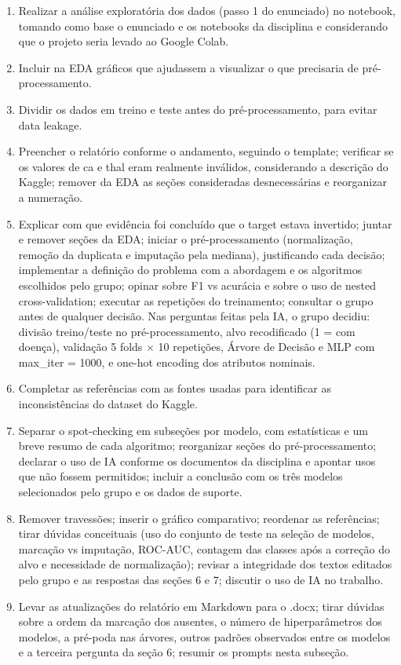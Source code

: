 \documentclass[11pt,letterpaper]{article}
\begin{document}
\begin{enumerate}
\item Realizar a análise exploratória dos dados (passo 1 do enunciado) no notebook, tomando como base o enunciado e os notebooks da disciplina e considerando que o projeto seria levado ao Google Colab.
\item Incluir na EDA gráficos que ajudassem a visualizar o que precisaria de pré-processamento.
\item Dividir os dados em treino e teste antes do pré-processamento, para evitar data leakage.
\item Preencher o relatório conforme o andamento, seguindo o template; verificar se os valores de ca e thal eram realmente inválidos, considerando a descrição do Kaggle; remover da EDA as seções consideradas desnecessárias e reorganizar a numeração.
\item Explicar com que evidência foi concluído que o target estava invertido; juntar e remover seções da EDA; iniciar o pré-processamento (normalização, remoção da duplicata e imputação pela mediana), justificando cada decisão; implementar a definição do problema com a abordagem e os algoritmos escolhidos pelo grupo; opinar sobre F1 vs acurácia e sobre o uso de nested cross-validation; executar as repetições do treinamento; consultar o grupo antes de qualquer decisão. Nas perguntas feitas pela IA, o grupo decidiu: divisão treino/teste no pré-processamento, alvo recodificado (1 = com doença), validação 5 folds \(\times\) 10 repetições, Árvore de Decisão e MLP com max\_iter = 1000, e one-hot encoding dos atributos nominais.
\item Completar as referências com as fontes usadas para identificar as inconsistências do dataset do Kaggle.
\item Separar o spot-checking em subseções por modelo, com estatísticas e um breve resumo de cada algoritmo; reorganizar seções do pré-processamento; declarar o uso de IA conforme os documentos da disciplina e apontar usos que não fossem permitidos; incluir a conclusão com os três modelos selecionados pelo grupo e os dados de suporte.
\item Remover travessões; inserir o gráfico comparativo; reordenar as referências; tirar dúvidas conceituais (uso do conjunto de teste na seleção de modelos, marcação vs imputação, ROC-AUC, contagem das classes após a correção do alvo e necessidade de normalização); revisar a integridade dos textos editados pelo grupo e as respostas das seções 6 e 7; discutir o uso de IA no trabalho.
\item Levar as atualizações do relatório em Markdown para o .docx; tirar dúvidas sobre a ordem da marcação dos ausentes, o número de hiperparâmetros dos modelos, a pré-poda nas árvores, outros padrões observados entre os modelos e a terceira pergunta da seção 6; resumir os prompts nesta subseção.

\end{enumerate}
\end{document}
